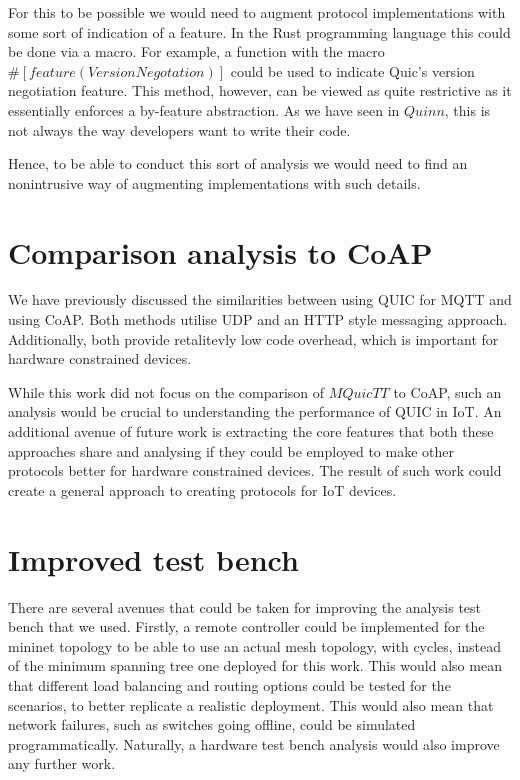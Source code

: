 For this to be possible we would need to augment protocol implementations with some sort of indication of a feature.
In the Rust programming language this could be done via a macro.
For example, a function with the macro $\#[feature(VersionNegotation)]$ could be used to indicate Quic's version negotiation feature.
This method, however, can be viewed as quite restrictive as it essentially enforces a by-feature abstraction.
As we have seen in $Quinn$, this is not always the way developers want to write their code.

Hence, to be able to conduct this sort of analysis we would need to find an nonintrusive way of augmenting implementations with such details.

\section{Comparison analysis to CoAP}

We have previously discussed the similarities between using QUIC for MQTT and using CoAP.
Both methods utilise UDP and an HTTP style messaging approach.
Additionally, both provide retalitevly low code overhead, which is important for hardware constrained devices.

While this work did not focus on the comparison of $MQuicTT$ to CoAP, such an analysis would be crucial to understanding the performance of QUIC in IoT.
An additional avenue of future work is extracting the core features that both these approaches share and analysing if they could be employed to make other protocols better for hardware constrained devices.
The result of such work could create a general approach to creating protocols for IoT devices.

\section{Improved test bench}

There are several avenues that could be taken for improving the analysis test bench that we used.
Firstly, a remote controller could be implemented for the mininet topology to be able to use an actual mesh topology, with cycles, instead of the minimum spanning tree one deployed for this work.
This would also mean that different load balancing and routing options could be tested for the scenarios, to better replicate a realistic deployment.
This would also mean that network failures, such as switches going offline, could be simulated programmatically.
Naturally, a hardware test bench analysis would also improve any further work.